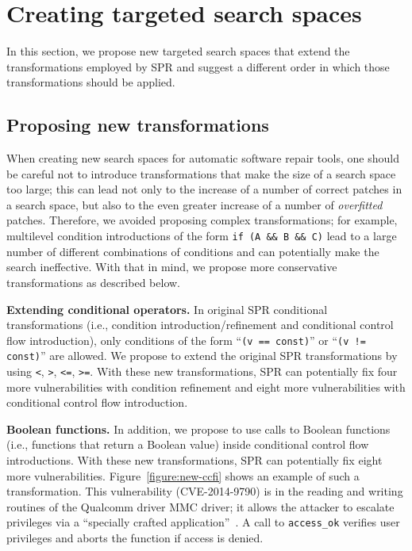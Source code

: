 \section{Creating targeted search spaces}
\label{section:creating}

In this section, we propose new targeted search spaces that extend the transformations employed by SPR and suggest a different order in which those transformations should be applied.

\subsection{Proposing new transformations}

When creating new search spaces for automatic software repair tools, one should be careful not to introduce transformations that make the size of a search space too large; this can lead not only to the increase of a number of correct patches in a search space, but also to the even greater increase of a number of \emph{overfitted} patches. Therefore, we avoided proposing complex transformations; for example, multilevel condition introductions of the form \texttt{if (A \&\& B \&\& C)} lead to a large number of different combinations of conditions and can potentially make the search ineffective. With that in mind, we propose more conservative transformations as described below.

\textbf{Extending conditional operators.} In original SPR conditional transformations (i.e., condition introduction/refinement and conditional control flow introduction), only conditions of the form ``\texttt{(v == const)}'' or ``\texttt{(v != const)}'' are allowed. We propose to extend the original SPR transformations by using \texttt{<}, \texttt{>}, \texttt{<=}, \texttt{>=}. With these new transformations, SPR can potentially fix four more vulnerabilities with condition refinement and eight more vulnerabilities with conditional control flow introduction.

\textbf{Boolean functions.} In addition, we propose to use calls to Boolean functions (i.e., functions that return a Boolean value) inside conditional control flow introductions. With these new transformations, SPR can potentially fix eight more vulnerabilities. Figure~\ref{figure:new-ccfi} shows an example of such a transformation. This vulnerability (CVE-2014-9790) is in the reading and writing routines of the Qualcomm driver MMC driver; it allows the attacker to escalate privileges via a ``specially crafted application''~\cite{cve-2014-9790}. A call to \texttt{access\_ok} verifies user privileges and aborts the function if access is denied.

